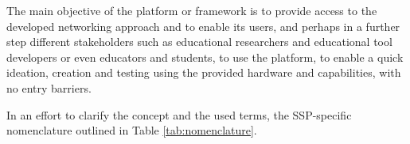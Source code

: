 The main objective of the platform or framework is to provide access to the developed networking approach and to enable its users, and perhaps in a further step different stakeholders such as educational researchers and educational tool developers or even educators and students, to use the platform, to enable a quick ideation, creation and testing using the provided hardware and capabilities, with no entry barriers.


In an effort to clarify the concept and the used terms, the SSP-specific nomenclature outlined in Table \ref{tab:nomenclature}.

